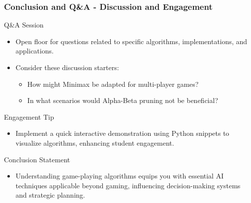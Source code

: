 \documentclass[aspectratio=169]{beamer}
\begin{document}
\begin{frame}[fragile]
    \frametitle{Conclusion and Q\&A - Discussion and Engagement}
    \begin{block}{Q\&A Session}
        \begin{itemize}
            \item Open floor for questions related to specific algorithms, implementations, and applications.
            \item Consider these discussion starters:
            \begin{itemize}
                \item How might Minimax be adapted for multi-player games?
                \item In what scenarios would Alpha-Beta pruning not be beneficial?
            \end{itemize}
        \end{itemize}
    \end{block}
    
    \begin{block}{Engagement Tip}
        \begin{itemize}
            \item Implement a quick interactive demonstration using Python snippets to visualize algorithms, enhancing student engagement.
        \end{itemize}
    \end{block}

    \begin{block}{Conclusion Statement}
        \begin{itemize}
            \item Understanding game-playing algorithms equips you with essential AI techniques applicable beyond gaming, influencing decision-making systems and strategic planning.
        \end{itemize}
    \end{block}
\end{frame}
\end{document}
